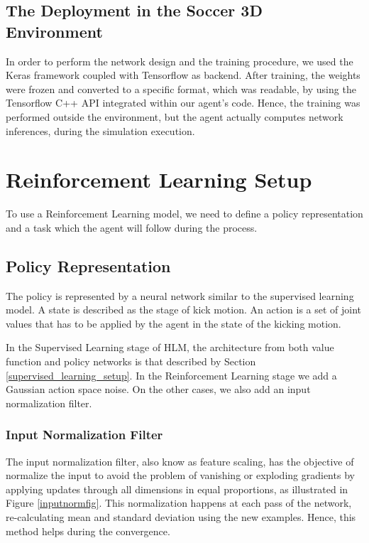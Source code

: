 \subsection{The Deployment in the Soccer 3D Environment}
In order to perform the network design and the training procedure, we used the Keras \cite{chollet2015keras} framework coupled with Tensorflow \cite{tensorflow2015-whitepaper} as backend. After training, the weights were frozen and converted to a specific format, which was readable, by using the Tensorflow C++ API integrated within our agent's code. Hence, the training was performed outside the environment, but the agent actually computes network inferences, during the simulation execution.

\section{Reinforcement Learning Setup}

To use a Reinforcement Learning model, we need to define a policy representation and a task which the agent will follow during the process.

\subsection{Policy Representation}

The policy is represented by a neural network similar to the supervised learning model. A state is described as the stage of kick motion. An action is a set of joint values that has to be applied by the agent in the state of the kicking motion.

In the Supervised Learning stage of HLM, the architecture from both value function and policy networks is that described by Section \ref{supervised_learning_setup}. In the Reinforcement Learning stage we add a Gaussian action space noise. On the other cases, we also add an input normalization filter.

\subsubsection{Input Normalization Filter}\label{sec:inputnorm}
The input normalization filter, also know as feature scaling, has the objective of normalize the input to avoid the problem of vanishing or exploding gradients by applying updates through all dimensions in equal proportions, as illustrated in Figure \ref{inputnormfig}. This normalization happens at each pass of the network, re-calculating mean and standard deviation using the new examples. Hence, this method helps during the convergence.

